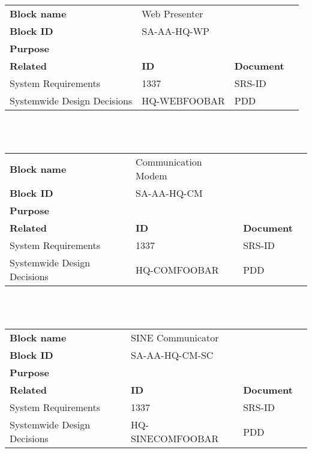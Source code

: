 \begin{tabular}{l|*{3}{l}}
    \textbf{Block name}     & Web Presenter\\
    \textbf{Block ID}       & SA-AA-HQ-WP & \\
    \textbf{Purpose}        &  \\
    \hline
    \textbf{Related}    & \textbf{ID} & \textbf{Document} \\
    System Requirements & 1337 & SRS-ID \\
    Systemwide Design Decisions & HQ-WEBFOOBAR & PDD \\
\end{tabular}\\\\

\begin{tabular}{l|*{3}{l}}
    \textbf{Block name}     & Communication Modem\\
    \textbf{Block ID}       & SA-AA-HQ-CM  & \\
    \textbf{Purpose}        &  \\
    \hline
    \textbf{Related}    & \textbf{ID} & \textbf{Document} \\
    System Requirements & 1337 & SRS-ID \\
    Systemwide Design Decisions & HQ-COMFOOBAR & PDD \\
\end{tabular}\\\\


\begin{tabular}{l|*{3}{l}}
    \textbf{Block name}     & SINE Communicator\\
    \textbf{Block ID}       & SA-AA-HQ-CM-SC  & \\
    \textbf{Purpose}        &  \\
    \hline
    \textbf{Related}    & \textbf{ID} & \textbf{Document} \\
    System Requirements & 1337 & SRS-ID \\
    Systemwide Design Decisions & HQ-SINECOMFOOBAR & PDD \\
\end{tabular}\\\\

